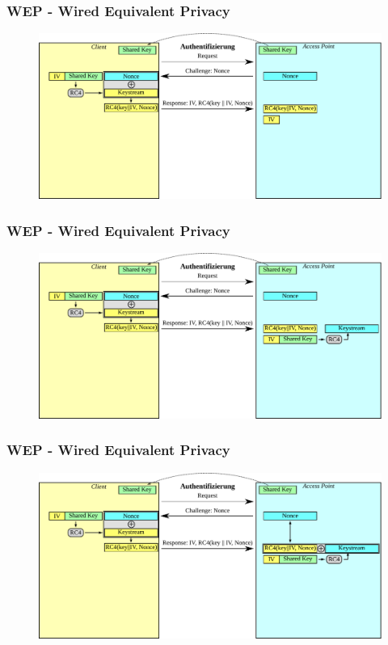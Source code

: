 \documentclass{beamer}
\begin{document}
\begin{frame}
\frametitle{WEP - Wired Equivalent Privacy}
\begin{figure}
	\includegraphics[width=1.0\linewidth]{figures/WEP_auth_6.pdf}
\end{figure}
\end{frame}

\begin{frame}
\frametitle{WEP - Wired Equivalent Privacy}
\begin{figure}
	\includegraphics[width=1.0\linewidth]{figures/WEP_auth_7.pdf}
\end{figure}
\end{frame}

\begin{frame}
\frametitle{WEP - Wired Equivalent Privacy}
\begin{figure}
	\includegraphics[width=1.0\linewidth]{figures/WEP_auth_8.pdf}
\end{figure}
\end{frame}
\end{document}
